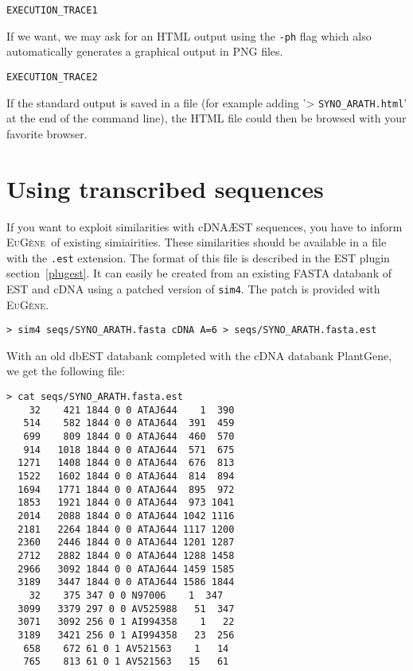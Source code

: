 \documentclass[a4paper,titlepage]{report}
\newcommand{\EuGenie}{\textsc{EuG\`ene}}
\begin{document}
\begin{Verbatim}[fontsize=\scriptsize]
EXECUTION_TRACE1
\end{Verbatim}

If we want, we may ask for an HTML output using the \texttt{-ph} flag
which also automatically generates a graphical output in PNG files.

\begin{Verbatim}[fontsize=\scriptsize]
EXECUTION_TRACE2
\end{Verbatim}

If the standard output is saved in a file (for example adding '> \texttt{SYNO\_ARATH.html}' at the end of the command line), the HTML file could then be browsed with your favorite browser.  

\section{Using transcribed sequences}

If you want to exploit similarities with cDNA\AE ST sequences, you have
to inform \EuGenie\ of existing simiairities. These similarities
should be available in a file with the \texttt{.est} extension. The
format of this file is described in the EST plugin
section~\ref{plugest}. It can easily be created from an existing FASTA
databank of EST and cDNA using a patched version of \texttt{sim4}. The
patch is provided with \EuGenie.

\begin{Verbatim}[fontsize=\scriptsize]
> sim4 seqs/SYNO_ARATH.fasta cDNA A=6 > seqs/SYNO_ARATH.fasta.est
\end{Verbatim}

With an old dbEST databank completed with the cDNA databank PlantGene,
we get the following file:

\begin{Verbatim}[fontsize=\scriptsize]
> cat seqs/SYNO_ARATH.fasta.est
    32    421 1844 0 0 ATAJ644    1  390
   514    582 1844 0 0 ATAJ644  391  459
   699    809 1844 0 0 ATAJ644  460  570
   914   1018 1844 0 0 ATAJ644  571  675
  1271   1408 1844 0 0 ATAJ644  676  813
  1522   1602 1844 0 0 ATAJ644  814  894
  1694   1771 1844 0 0 ATAJ644  895  972
  1853   1921 1844 0 0 ATAJ644  973 1041
  2014   2088 1844 0 0 ATAJ644 1042 1116
  2181   2264 1844 0 0 ATAJ644 1117 1200
  2360   2446 1844 0 0 ATAJ644 1201 1287
  2712   2882 1844 0 0 ATAJ644 1288 1458
  2966   3092 1844 0 0 ATAJ644 1459 1585
  3189   3447 1844 0 0 ATAJ644 1586 1844
    32    375 347 0 0 N97006    1  347
  3099   3379 297 0 0 AV525988   51  347
  3071   3092 256 0 1 AI994358    1   22
  3189   3421 256 0 1 AI994358   23  256
   658    672 61 0 1 AV521563    1   14
   765    813 61 0 1 AV521563   15   61
\end{Verbatim}
\end{document}

